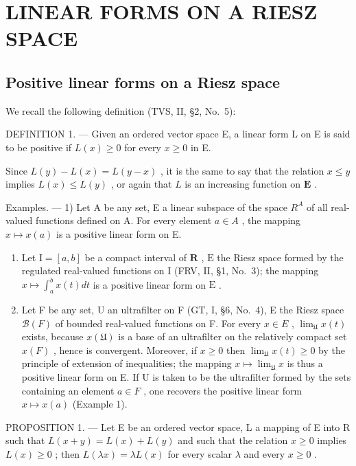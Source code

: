 \section{LINEAR FORMS ON A RIESZ SPACE}

\subsection{Positive linear forms on a Riesz space}

We recall the following definition (TVS, II, §2, No.~5):

DEFINITION 1. --- Given an ordered vector space E, a linear form L on E is said to be positive if \(L(x) \geqslant 0\) for every \(x \geqslant 0\) in E.

Since \(L(y) - L(x) = L(y - x)\) , it is the same to say that the relation \(x \leqslant y\) implies \(L(x) \leqslant L(y)\) , or again that \(L\) is an increasing function on \(\mathbf{E}\) .

Examples. --- 1) Let A be any set, E a linear subspace of the space \(R^{A}\) of all real-valued functions defined on A. For every element \(a \in A\) , the mapping \(x \mapsto x(a)\) is a positive linear form on E.

\begin{enumerate}
\def\labelenumi{\arabic{enumi})}
\setcounter{enumi}{1}
\item
  Let \(\mathrm{I} = [a, b]\) be a compact interval of \(\mathbf{R}\) , \(\mathrm{E}\) the Riesz space formed by the regulated real-valued functions on \(\mathrm{I}\) (FRV, II, §1, No.~3); the mapping \(x \mapsto \int_{a}^{b} x(t) dt\) is a positive linear form on \(\mathrm{E}\) .
\item
  Let F be any set, U an ultrafilter on F (GT, I, §6, No.~4), E the Riesz space \(\mathcal{B}(F)\) of bounded real-valued functions on F. For every \(x \in E\) , \(\lim_{\mathfrak{U}} x(t)\) exists, because \(x(\mathfrak{U})\) is a base of an ultrafilter on the relatively compact set \(x(F)\) , hence is convergent. Moreover, if \(x \geqslant 0\) then \(\lim_{\mathfrak{U}} x(t) \geqslant 0\) by the principle of extension of inequalities; the mapping \(x \mapsto \lim_{\mathfrak{U}} x\) is thus a positive linear form on E. If U is taken to be the ultrafilter formed by the sets containing an element \(a \in F\) , one recovers the positive linear form \(x \mapsto x(a)\) (Example 1).
\end{enumerate}

PROPOSITION 1. --- Let E be an ordered vector space, L a mapping of E into R such that \(L(x+y)=L(x)+L(y)\) and such that the relation \(x\geqslant0\) implies \(L(x)\geqslant0\) ; then \(L(\lambda x)=\lambda L(x)\) for every scalar \(\lambda\) and every \(x\geqslant0\) .

